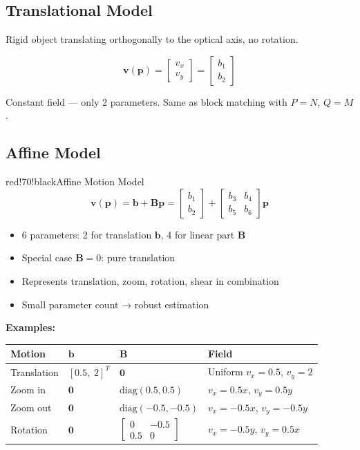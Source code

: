 \subsection{Translational Model}

Rigid object translating orthogonally to the optical axis, no rotation.

\[
\mathbf{v}(\mathbf{p}) = \begin{bmatrix} v_x \\ v_y \end{bmatrix} = \begin{bmatrix} b_1 \\ b_2 \end{bmatrix}
\]

Constant field — only 2 parameters. Same as block matching with $P = N$, $Q = M$.

\subsection{Affine Model}

\begin{calloutbox}{red!70!black}{Affine Motion Model}
\[
\mathbf{v}(\mathbf{p}) = \mathbf{b} + \mathbf{B}\mathbf{p} = \begin{bmatrix} b_1 \\ b_2 \end{bmatrix} + \begin{bmatrix} b_3 & b_4 \\ b_5 & b_6 \end{bmatrix} \mathbf{p}
\]
\begin{itemize}
\item 6 parameters: 2 for translation $\mathbf{b}$, 4 for linear part $\mathbf{B}$
\item Special case $\mathbf{B} = 0$: pure translation
\item Represents translation, zoom, rotation, shear in combination
\item Small parameter count → robust estimation
\end{itemize}
\end{calloutbox}

\textbf{Examples:}

\begin{center}
\begin{tabular}{|l|l|l|l|}
\hline
\textbf{Motion} & \textbf{$\mathbf{b}$} & \textbf{$\mathbf{B}$} & \textbf{Field} \\ \hline
Translation & $[0.5,\; 2]^T$ & $\mathbf{0}$ & Uniform $v_x=0.5$, $v_y=2$ \\ \hline
Zoom in & $\mathbf{0}$ & $\text{diag}(0.5, 0.5)$ & $v_x=0.5x$, $v_y=0.5y$ \\ \hline
Zoom out & $\mathbf{0}$ & $\text{diag}(-0.5,-0.5)$ & $v_x=-0.5x$, $v_y=-0.5y$ \\ \hline
Rotation & $\mathbf{0}$ & $\begin{bmatrix}0&-0.5\\0.5&0\end{bmatrix}$ & $v_x=-0.5y$, $v_y=0.5x$ \\ \hline
\end{tabular}
\end{center}

